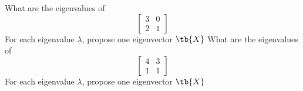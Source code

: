 \bexo
What are the eigenvalues of 
\begin{equation*}
\left[
\begin{array}{cc}
3 & 0 \\
2 & 1
\end{array}
\right]
\end{equation*}
For each eigenvalue $\lambda$, propose one eigenvector $\tb{X}$
\eexo{}
\bexo
What are the eigenvalues of 
\begin{equation*}
\left[
\begin{array}{cc}
4 & 3 \\
1 & 1
\end{array}
\right]
\end{equation*}
For each eigenvalue $\lambda$, propose one eigenvector $\tb{X}$
\eexo{}


